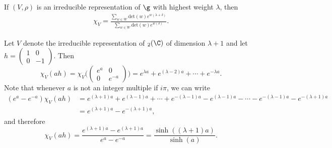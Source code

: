 \begin{theorem}\label{Weyl character formula}
If $(V,\rho)$ is an irreducible representation of $\g$ with highest weight $\lambda$, then
\begin{align}\label{Weyl character formula-1}
\chi_V=\frac{\sum_{w\in W}\mathrm{det}(w) e^{w(\lambda+\delta)}}{\sum_{w\in W}\mathrm{det}(w) e^{w(\delta)}}.
\end{align}
\end{theorem}
\begin{example}
Let $V$ denote the irreducible representation of $\sl_2(\C)$ of dimension $\lambda+1$ and let $h=(\begin{smallmatrix}1&0\\0&-1\end{smallmatrix})$. Then
\[\chi_V(ah)=\chi_V\Big(\begin{pmatrix}
e^a&0\\
0&e^{-a}
\end{pmatrix}\Big)=e^{\lambda a}+e^{(\lambda-2)a}+\cdots+e^{-\lambda a}.\]
Note that whenever $a$ is not an integer multiple if $i\pi$, we can write
\begin{align*}
(e^a-e^{-a})\chi_V(ah)&=e^{(\lambda+1)a}+e^{(\lambda-1)a}+\cdots+e^{-(\lambda-1)a}-e^{(\lambda-1)a}-\cdots-e^{-(\lambda-1)a}-e^{-(\lambda+1)a}\\
&=e^{(\lambda+1)a}-e^{-(\lambda+1)a},
\end{align*}
and therefore
\[\chi_V(ah)=\frac{e^{(\lambda+1)a}-e^{(\lambda+1)a}}{e^a-e^{-a}}=\frac{\sinh((\lambda+1)a)}{\sinh(a)}.\]
\end{example}
